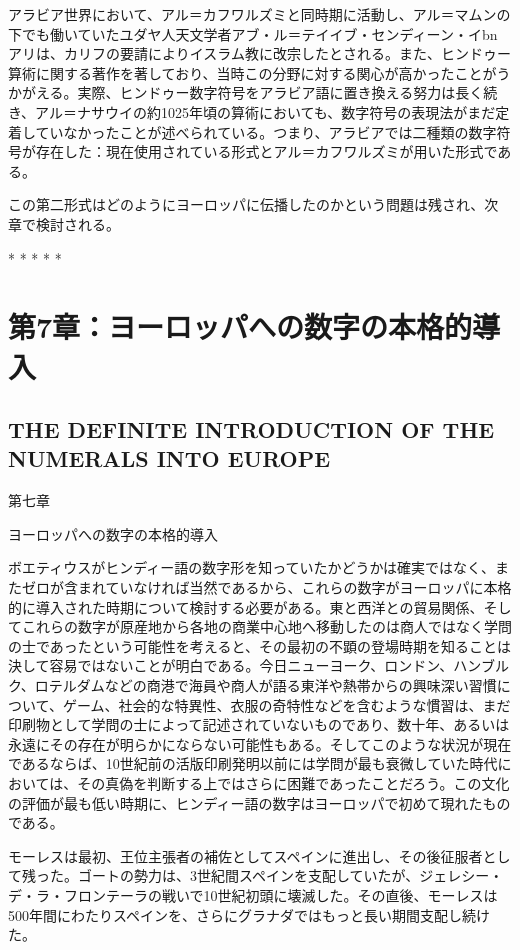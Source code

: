\documentclass[a4paper,11pt,openany]{ltjsbook}
\begin{document}
アラビア世界において、アル＝カフワルズミと同時期に活動し、アル＝マムンの下でも働いていたユダヤ人天文学者アブ・ル＝テイイブ・センディーン・イbn アリは、カリフの要請によりイスラム教に改宗したとされる。また、ヒンドゥー算術に関する著作を著しており、当時この分野に対する関心が高かったことがうかがえる。実際、ヒンドゥー数字符号をアラビア語に置き換える努力は長く続き、アル＝ナサウイの約1025年頃の算術においても、数字符号の表現法がまだ定着していなかったことが述べられている。つまり、アラビアでは二種類の数字符号が存在した：現在使用されている形式とアル＝カフワルズミが用いた形式である。

この第二形式はどのようにヨーロッパに伝播したのかという問題は残され、次章で検討される。

*       *       *       *       *

\clearpage

\chapter{第7章：ヨーロッパへの数字の本格的導入}
\section*{THE DEFINITE INTRODUCTION OF THE NUMERALS INTO EUROPE}

第七章

ヨーロッパへの数字の本格的導入

ボエティウスがヒンディー語の数字形を知っていたかどうかは確実ではなく、またゼロが含まれていなければ当然であるから、これらの数字がヨーロッパに本格的に導入された時期について検討する必要がある。東と西洋との貿易関係、そしてこれらの数字が原産地から各地の商業中心地へ移動したのは商人ではなく学問の士であったという可能性を考えると、その最初の不顕の登場時期を知ることは決して容易ではないことが明白である。今日ニューヨーク、ロンドン、ハンブルク、ロテルダムなどの商港で海員や商人が語る東洋や熱帯からの興味深い習慣について、ゲーム、社会的な特異性、衣服の奇特性などを含むような慣習は、まだ印刷物として学問の士によって記述されていないものであり、数十年、あるいは永遠にその存在が明らかにならない可能性もある。そしてこのような状況が現在であるならば、10世紀前の活版印刷発明以前には学問が最も衰微していた時代においては、その真偽を判断する上ではさらに困難であったことだろう。この文化の評価が最も低い時期に、ヒンディー語の数字はヨーロッパで初めて現れたものである。

モーレスは最初、王位主張者の補佐としてスペインに進出し、その後征服者として残った。ゴートの勢力は、3世紀間スペインを支配していたが、ジェレシー・デ・ラ・フロンテーラの戦いで10世紀初頭に壊滅した。その直後、モーレスは500年間にわたりスペインを、さらにグラナダではもっと長い期間支配し続けた。
\end{document}
